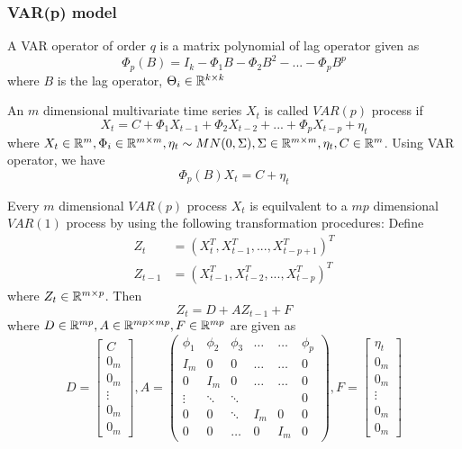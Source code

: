 \subsubsection{VAR(p) model}
\begin{definition}
	A VAR operator of order $q$ is a matrix polynomial of lag operator given as
	$$\Phi_p(B) = I_k - \Phi_1B - \Phi_2 B^2 - ... - \Phi_p B^p$$
	where $B$ is the lag operator, $\Theta_i \in \mathbb{R}^{k\times k}$
\end{definition}





\begin{definition}\cite[27]{tsay2005analysis}
	An $m$ dimensional multivariate time series $X_t$ is called $VAR(p)$ process if 
	$$X_t = C + \Phi_1 X_{t-1} + \Phi_2 X_{t-2} + ... + \Phi_pX_{t-p} + \eta_t$$
	where $X_t\in \mathbb{R}^m,\Phi_i\in \mathbb{R}^{m\times m}, \eta_t\sim MN(0,\Sigma),\Sigma \in \mathbb{R}^{m\times m}, \eta_t, C \in \mathbb{R}^m$.
	Using VAR operator, we have
	$$\Phi_p(B) X_t = C + \eta_t$$
\end{definition}


\begin{lemma}
Every $m$ dimensional $VAR(p)$ process $X_t$ is equilvalent to a $mp$ dimensional $VAR(1)$ process by using the following transformation procedures:
Define
\begin{align*}
Z_t &= (X_t^T,X_{t-1}^T,...,X_{t-p+1}^T)^T\\
Z_{t-1} &= (X_{t-1}^T,X_{t-2}^T,...,X_{t-p}^T)^T
\end{align*}
where $Z_t \in \mathbb{R}^{m\times p}$. Then
$$Z_t = D + AZ_{t-1} + F$$
where $D\in \mathbb{R}^{mp},A\in \mathbb{R}^{mp\times mp},F\in \mathbb{R}^{mp}$ are given as
$$
D = \begin{bmatrix}
	C\\ 0_m \\ 0_m \\ \vdots \\ 0_m \\0_m
\end{bmatrix}
,
A = \begin{pmatrix}
	\phi_1 & \phi_2 & \phi_3 & \dots & \dots & \phi_p\\ 
	I_m & 0 & 0 & \dots & \dots & 0 \\ 
	0 & I_m & 0 & \dots & \dots & 0 \\ 
	\vdots & \ddots & \ddots &  &  & 0\\ 
	0 & 0 & \ddots & I_m & 0 & 0\\ 
	0 & 0 &  \dots & 0 & I_m & 0
\end{pmatrix}
,
F = \begin{bmatrix}
	\eta_t\\ 0_m \\ 0_m \\ \vdots \\ 0_m \\0_m
\end{bmatrix}
$$ 
\end{lemma}


